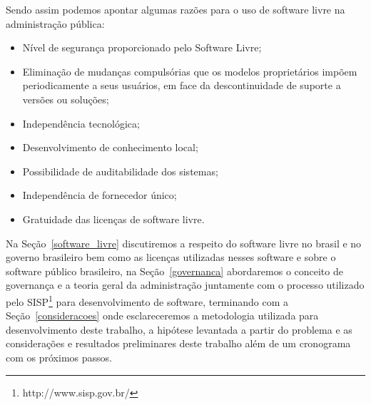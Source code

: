 Sendo assim podemos apontar algumas razões para o uso de software livre na administração 
pública:

\begin{itemize}

\item Nível de segurança proporcionado pelo Software Livre;
\item Eliminação de mudanças compulsórias que os modelos proprietários impõem
periodicamente a seus usuários, em face da descontinuidade de suporte a
versões ou soluções; 
\item Independência tecnológica; 
\item Desenvolvimento de conhecimento local; 
\item Possibilidade de auditabilidade dos sistemas;
\item Independência de fornecedor único;
\item Gratuidade das licenças de software livre.
\end{itemize}


Na Seção~\ref{software_livre} discutiremos a respeito do software livre no brasil e no governo 
brasileiro bem como as licenças utilizadas nesses software e sobre o software público 
brasileiro,
%
na Seção~\ref{governanca} abordaremos o conceito de governança e a teoria geral
da administração juntamente com o processo utilizado pelo SISP\footnote{http://www.sisp.gov.br/}
para desenvolvimento de software,
%
terminando com a Seção~\ref{consideracoes} onde esclareceremos a metodologia utilizada para desenvolvimento
deste trabalho, a hipótese levantada a partir do problema e as considerações e resultados preliminares 
deste trabalho além de um cronograma com os próximos passos. 


